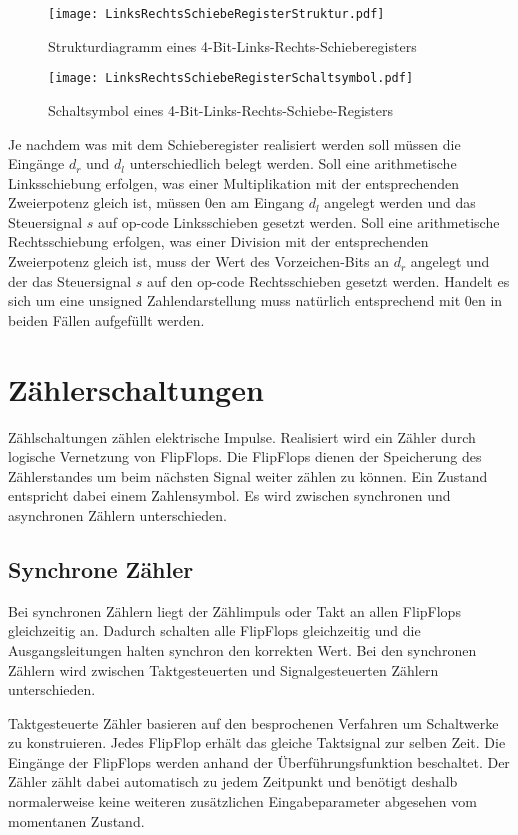 \begin{figure}[htp]
	\centering
	\texttt{[image: LinksRechtsSchiebeRegisterStruktur.pdf]}
	\caption{Strukturdiagramm eines 4-Bit-Links-Rechts-Schieberegisters}
	\label{lrSchiebeStruk}
\end{figure}

\begin{figure}[htp]
	\centering
	\texttt{[image: LinksRechtsSchiebeRegisterSchaltsymbol.pdf]}
	\caption{Schaltsymbol eines 4-Bit-Links-Rechts-Schiebe-Registers}
	\label{lrSchiebeSym}
\end{figure}

Je nachdem was mit dem Schieberegister realisiert werden soll müssen die Eingänge $d_r$ und $d_l$ unterschiedlich belegt werden. Soll eine arithmetische Linksschiebung erfolgen, was einer Multiplikation mit der entsprechenden Zweierpotenz gleich ist, müssen 0en am Eingang $d_l$ angelegt werden und das Steuersignal $s$ auf op-code Linksschieben gesetzt werden. Soll eine arithmetische Rechtsschiebung erfolgen, was einer Division mit der entsprechenden Zweierpotenz gleich ist, muss der Wert des Vorzeichen-Bits an $d_r$ angelegt und der das Steuersignal $s$ auf den op-code Rechtsschieben gesetzt werden. Handelt es sich um eine unsigned Zahlendarstellung muss natürlich entsprechend mit 0en in beiden Fällen aufgefüllt werden. 

\section{Zählerschaltungen}
Zählschaltungen zählen elektrische Impulse. Realisiert wird ein Zähler durch logische Vernetzung von FlipFlops. Die FlipFlops dienen der Speicherung des Zählerstandes um beim nächsten Signal weiter zählen zu können. Ein Zustand entspricht dabei einem Zahlensymbol. Es wird zwischen synchronen und asynchronen Zählern unterschieden. 

\subsection{Synchrone Zähler}
Bei synchronen Zählern liegt der Zählimpuls oder Takt an allen FlipFlops gleichzeitig an. Dadurch schalten alle FlipFlops gleichzeitig und die Ausgangsleitungen halten synchron den korrekten Wert. Bei den synchronen Zählern wird zwischen Taktgesteuerten und Signalgesteuerten Zählern unterschieden.

Taktgesteuerte Zähler basieren auf den besprochenen Verfahren um Schaltwerke zu konstruieren. Jedes FlipFlop erhält das gleiche Taktsignal zur selben Zeit. Die Eingänge der FlipFlops werden anhand der Überführungsfunktion beschaltet. Der Zähler zählt dabei automatisch zu jedem Zeitpunkt und benötigt deshalb normalerweise keine weiteren zusätzlichen Eingabeparameter abgesehen vom momentanen Zustand.

